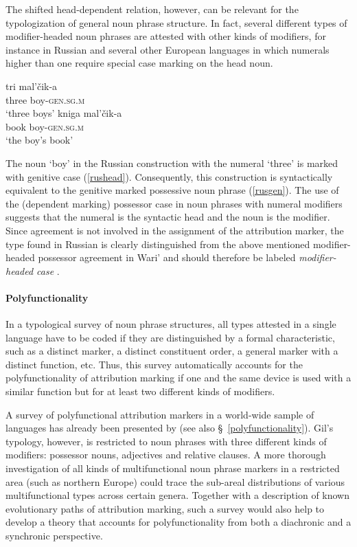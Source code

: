 The shifted head-dependent relation, however, can be relevant for the typologization of general noun phrase structure. In fact, several different types of modifier-headed noun phrases are attested with other kinds of modifiers, for instance in Russian and several other European languages in which numerals higher than one require special case marking on the head noun.
\begin{exe}
\ex \label{russianheadstand} 
\begin{xlist}
\ex \label{rushead}
\gll tri mal'čik-a\\
  	three		boy-\textsc{gen.sg.m}\\
  \glt ‘three boys’
\ex \label{rusgen}
  \gll	kniga mal'čik-a\\
  	book	 boy-\textsc{gen.sg.m}\\
  \trans ‘the boy's book’
\end{xlist}
\end{exe}
The noun ‘boy’ in the Russian construction with the numeral ‘three’ is marked with genitive case (\ref{rushead}). Consequently, this construction is syntactically equivalent to the genitive marked possessive noun phrase (\ref{rusgen}). The use of the (dependent marking) possessor case in noun phrases with numeral modifiers suggests that the numeral is the syntactic head and the noun is the modifier. Since agreement is not involved in the assignment of the attribution marker, the type found in Russian is clearly distinguished from the above mentioned modifier-headed possessor agreement in Wari' and should therefore be labeled \textit{modifier-headed case} \citep[cf.]{AUTOTYP-NP}.

\paragraph{Polyfunctionality} 
In a typological survey of noun phrase structures, all types attested in a single language have to be coded if they are distinguished by a formal characteristic, such as a distinct marker, a distinct constituent order, a general marker with a distinct function, etc. Thus, this survey automatically accounts for the polyfunctionality of attribution marking if one and the same device is used with a similar function but for at least two different kinds of modifiers.

A survey of polyfunctional attribution markers in a world-wide sample of languages has already been presented by \citet{gil2005} (see also \S~\ref{polyfunctionality}). Gil's typology, however, is restricted to noun phrases with three different kinds of modifiers: possessor nouns, adjectives and relative clauses. A more thorough investigation of all kinds of multifunctional noun phrase markers in a restricted area (such as northern Europe) could trace the sub-areal distributions of various multifunctional types across certain genera. Together with a description of known evolutionary paths of attribution marking, such a survey would also help to develop a theory that accounts for polyfunctionality from both a diachronic and a synchronic perspective.
